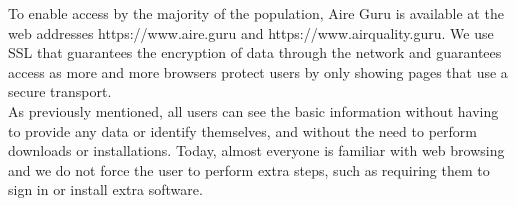 To enable access by the majority of the population, Aire Guru is available at the web addresses https://www.aire.guru and https://www.airquality.guru.
We use SSL that guarantees the encryption of data through the network and guarantees access as more and more browsers protect 
users by only showing pages that use a secure transport.\\

As previously mentioned, all users can see the basic information without having to provide any data or identify themselves, and without the need to
perform downloads or installations. Today, almost everyone is familiar with web browsing and we do not force the user to perform extra steps, such as 
requiring them to sign in or install extra software.\\

